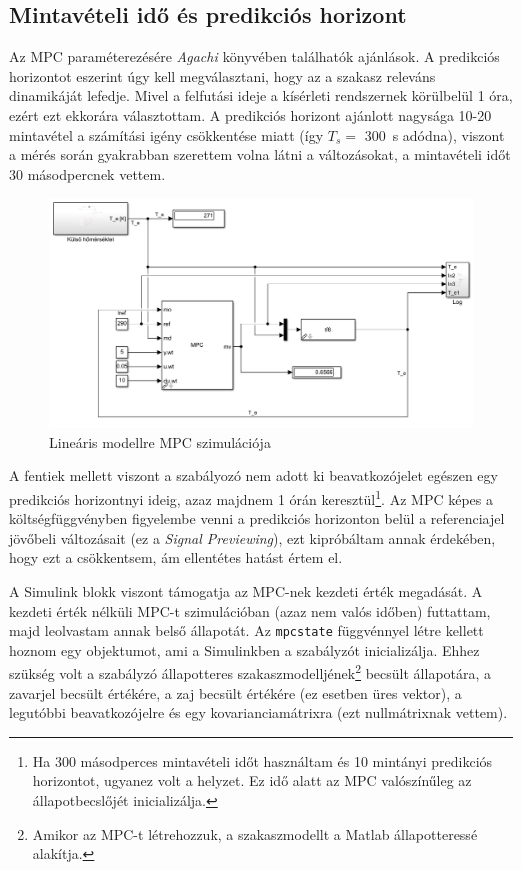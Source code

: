 \subsection{Mintavételi idő és predikciós horizont}

Az MPC paraméterezésére \textit{Agachi \cite{romanMPC_Agachi}} könyvében találhatók ajánlások. A predikciós horizontot eszerint úgy kell megválasztani, hogy az a szakasz releváns dinamikáját lefedje. Mivel a felfutási ideje a kísérleti rendszernek körülbelül 1 óra, ezért ezt ekkorára választottam. A predikciós horizont ajánlott nagysága 10-20 mintavétel a számítási igény csökkentése miatt (így $T_s =$ \SI{300}{\second} adódna),  viszont a mérés során gyakrabban szerettem volna látni a változásokat, a mintavételi időt 30 másodpercnek vettem.

\begin{figure}[h]
	\centering
	\includegraphics[width=\textwidth]{figures/simscape/simModel}
	\caption{Lineáris modellre MPC szimulációja}
	\label{fig:mpc-sim}
\end{figure}

A fentiek mellett viszont a szabályozó nem adott ki beavatkozójelet egészen egy predikciós horizontnyi ideig, azaz majdnem 1 órán keresztül\footnote{Ha 300 másodperces mintavételi időt használtam és 10 mintányi predikciós horizontot, ugyanez volt a helyzet. Ez idő alatt az MPC valószínűleg az állapotbecslőjét inicializálja.}. Az MPC képes a költségfüggvényben figyelembe venni a predikciós horizonton belül a referenciajel jövőbeli változásait (ez a \textit{Signal Previewing}), ezt kipróbáltam annak érdekében, hogy ezt a  csökkentsem, ám ellentétes hatást értem el.

A Simulink blokk viszont támogatja az MPC-nek kezdeti érték megadását. A kezdeti érték nélküli MPC-t szimulációban (azaz nem valós időben) futtattam, majd leolvastam annak belső állapotát. Az \verb|mpcstate| függvénnyel létre kellett hoznom egy objektumot, ami a Simulinkben a szabályzót inicializálja. Ehhez szükség volt a szabályzó állapotteres szakaszmodelljének\footnote{Amikor az MPC-t létrehozzuk, a szakaszmodellt a Matlab állapotteressé alakítja.} becsült állapotára, a zavarjel becsült értékére, a zaj becsült értékére (ez esetben üres vektor), a legutóbbi beavatkozójelre és egy kovarianciamátrixra (ezt nullmátrixnak vettem).

